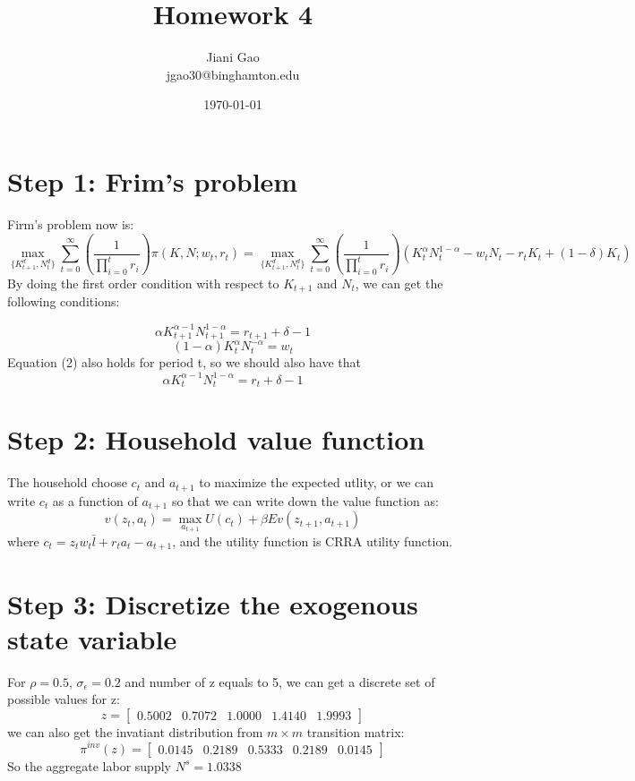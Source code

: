 \documentclass[12pt]{article}
\title{\bf Homework 4}
\author{Jiani Gao\\jgao30@binghamton.edu}
\affil{Department of Economics, Binghamton University}
\date{\today}
\begin{document}
\maketitle
\newpage
\tableofcontents	

\newpage

\section{Step 1: Frim's problem}

Firm's problem now is:
\[\max\limits_{\{K_{t+1}^d,N_t^d\}}\sum\limits_{t=0}^\infty(\frac{1}{\prod_{i=0}^{t} r_i})\pi (K,N;w_t,r_t)=\max\limits_{\{K_{t+1}^d,N_t^d\}}\sum\limits_{t=0}^\infty(\frac{1}{\prod_{i=0}^{t} r_i})(K_t^\alpha N_t^{1-\alpha}-w_t N_t-r_t K_{t}+(1-\delta)K_t) \tag{1}
\]	
By doing the first order condition with respect to $K_{t+1}$ and $N_t$, we can get the following conditions:

\[\alpha K_{t+1}^{\alpha -1}N_{t+1}^{1-\alpha}=r_{t+1}+\delta-1
\tag{2}
\]
\[(1-\alpha)K_t^\alpha N_t^{-\alpha}=w_t\tag{3}
\]
Equation (2) also holds for period t, so we should also have that 
\[\alpha K_{t}^{\alpha -1}N_{t}^{1-\alpha}=r_{t}+\delta-1
\tag{4}
\]
\section{Step 2: Household value function}
The household choose $c_t$ and $a_{t+1}$ to maximize the expected utlity, or we can write $c_t$ as a function of $a_{t+1}$ so that we can write down the value function as:
\[v(z_t,a_t)=\max\limits_{a_{t+1}}U(c_t)+\beta  E v(z_{t+1},a_{t+1})\tag{5}
\]
where $c_t=z_tw_t\bar{l}+r_ta_t-a_{t+1}$, and the utility function is CRRA utility function.

\section{Step 3: Discretize the exogenous state variable}
For $\rho=0.5$, $\sigma_\epsilon=0.2$ and number of z equals to 5, we can get a discrete set of possible values for z:
\[z=\begin{bmatrix}
0.5002&0.7072&1.0000&1.4140&1.9993
\end{bmatrix}\tag{6}
\]
we can also get the invatiant distribution from $m\times m$ transition matrix:
\[\pi^{inv}(z)=\begin{bmatrix}
0.0145&0.2189&0.5333& 0.2189& 0.0145

\end{bmatrix}\tag{7}
\]
So the aggregate labor supply $N^s=1.0338$
\end{document}
